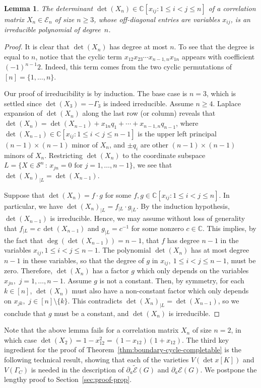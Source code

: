 \documentclass[a4paper, 11pt, twoside]{article}
\newcommand{\C}{\mathbb{C}}
\newcommand{\ME}{{\mathcal E}}
\newcommand{\MS}{{\mathcal S}}
\newcommand{\tME}{\widetilde \ME}
\theoremstyle{plain}
\newtheorem{lemma}[theorem]{Lemma}
\begin{document}
\begin{lemma}\label{lem:det-irreducible}
The determinant $\det (X_n)\in \C[x_{ij}: 1\le i<j\le n]$ of a correlation matrix $X_n \in \ME_n$ of size $n\ge 3$, whose off-diagonal entries are variables $x_{ij}$, is an irreducible polynomial of degree~$n$.
\end{lemma}
\begin{proof}
It is clear that $\det(X_n)$ has degree at most $n$. To see that the degree is equal to $n$, notice that the cyclic term $x_{12}x_{23} \cdots x_{n-1,n} x_{1n}$ appears with coefficient $(-1)^{n-1} 2$. Indeed, this term comes from the two cyclic permutations of $[n] = \{1, \ldots, n \}$. 


Our proof of irreducibility is by induction.  The base case is $n = 3$, which is settled since $\det (X_3)=-\Gamma_3$ is indeed irreducible. Assume $n\ge 4$. Laplace expansion of $\det(X_n)$ along the last row (or column) reveals that $\det(X_n) = \det(X_{n-1}) + x_{1n} q_1 + \cdots + x_{n-1,n} q_{n-1}$, where $\det(X_{n-1}) \in \mathbb{C}[x_{ij} : 1 \leq i < j \leq n-1]$ is the upper left principal $(n-1) \times (n-1)$ minor of $X_n$, and $ \pm q_i$ are other $(n-1) \times (n-1)$ minors of $X_n$. Restricting $\det(X_n)$ to the coordinate subspace $L = \{ X \in \MS^n \, : \, x_{jn} = 0 \text{ for } j = 1, \ldots, n-1 \}$, we see that $\det(X_n)_{|L} = \det(X_{n-1})$.

Suppose that $\det(X_n) = f \cdot g$ for some $f, g \in \C[x_{ij}: 1\le i<j\le n]$. In particular, we have $\det(X_n)_{|L} = f_{|L} \cdot g_{|L}$. By the induction hypothesis, $\det(X_{n-1})$ is irreducible. Hence, we may assume without loss of generality that $f_{|L} = c \, \det(X_{n-1})$ and $g_{|L} = c^{-1}$ for some nonzero $c \in \C$. This implies, by the fact that $\deg(\det(X_{n-1})) = n-1$, that $f$ has degree $n-1$ in the variables $x_{ij},  1 \leq i < j \leq n-1$. The polynomial $\det(X_n)$ has at most degree $n-1$ in these variables, so that the degree of $g$ in $x_{ij}, \ 1 \leq i < j \leq n-1$, must be zero. Therefore, $\det(X_n)$ has a factor $g$ which only depends on the variables $x_{jn},$ $ j = 1, \ldots, n-1$. Assume $g$ is not a constant. Then, by symmetry, for each $k\in [n]$, $\det(X_n)$ must also have a non-constant factor which only depends on $x_{jk},$ $ j\in [n] \setminus \{k\}$. This contradicts $\det(X_n)_{|L} = \det(X_{n-1})$, so we conclude that $g$ must be a constant, and $\det(X_n)$ is irreducible.
\end{proof}


Note that the above lemma fails for a correlation matrix $X_n$ of size $n=2$, in which case  $\det (X_2)=1-x_{12}^2=(1-x_{12})(1+x_{12})$. 
The third key ingredient for the proof of Theorem~\ref{thm:boundary-cycle-completable} is the following technical result, showing that each of the varieties $V(\det x[K])$ and $V(\Gamma_C)$  is needed in the description of   $\partial_a \tME(G)$ and $\partial_a\ME(G)$.
We postpone the lengthy proof   to Section~\ref{sec:proof-prop}.
\end{document}
